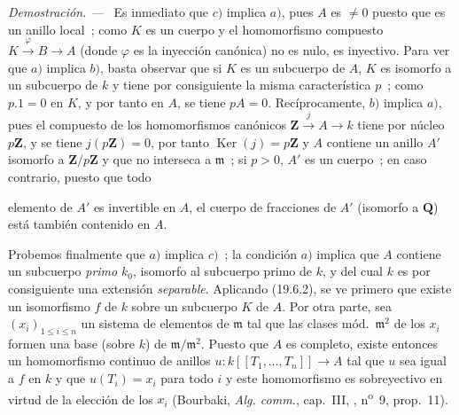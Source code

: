 \documentclass[10pt,oneside]{book}
\newcommand{\oldpage}[2][]{%
  \setcounter{footnote}{0}%
  \marginpar{\scriptsize\textbf{#1}~|~#2}\ignorespaces}
\newenvironment{proof}{%
  \par\medskip\noindent\textit{Demostración. ---\ }}{\par}
\begin{document}
\begin{proof}
Es inmediato que $c)$ implica $a)$, pues $A$ es $\neq0$ puesto que es un
anillo local~; como $K$ es un cuerpo y el homomorfismo compuesto
$K\xrightarrow{\varphi}B\to A$ (donde $\varphi$ es la inyección canónica) no es
nulo, es inyectivo. Para ver que $a)$ implica $b)$, basta
observar que si $K$ es un subcuerpo de $A$, $K$ es isomorfo a un
subcuerpo de $k$ y tiene por consiguiente la misma característica $p$~; como $p.1=0$ en
$K$, y por tanto en $A$, se tiene $pA=0$. Recíprocamente, $b)$ implica $a)$, pues el
compuesto de los homomorfismos canónicos
$\mathbf Z\xrightarrow{j}A\to k$ tiene por núcleo $p\mathbf Z$, y se tiene
$j(p\mathbf Z)=0$, por tanto $\operatorname{Ker}(j)=p\mathbf Z$ y $A$ contiene un
anillo $A'$ isomorfo a $\mathbf Z/p\mathbf Z$ y que no interseca a
$\mathfrak m$~; si $p>0$, $A'$ es un cuerpo~; en caso contrario, puesto que todo

\oldpage[0\textsubscript{IV-1}]{102}

elemento de $A'$ es invertible en $A$, el cuerpo de fracciones de $A'$
(isomorfo a $\mathbf Q$) está también contenido en $A$.

Probemos finalmente que $a)$ implica $c)$~; la condición $a)$ implica que $A$
contiene un subcuerpo \emph{primo} $k_0$, isomorfo al subcuerpo primo de $k$,
y del cual $k$ es por consiguiente una extensión \emph{separable}. Aplicando (19.6.2), se ve
primero que existe un isomorfismo $f$ de $k$ sobre un subcuerpo $K$ de $A$.
Por otra parte, sea $(x_i)_{1\leq i\leq n}$ un sistema de elementos de
$\mathfrak m$ tal que las clases mód.~$\mathfrak m^2$ de los $x_i$ formen una
base (sobre $k$) de $\mathfrak m/\mathfrak m^2$. Puesto que $A$ es completo, existe
entonces un homomorfismo continuo de anillos
$u:k[[T_1,\ldots,T_n]]\to A$ tal que $u$ sea igual a $f$ en $k$ y que
$u(T_i)=x_i$ para todo $i$ y este homomorfismo es sobreyectivo en virtud de la
elección de los $x_i$ (Bourbaki, \emph{Alg. comm.}, cap.~III, ,
n\textsuperscript{o}~9, prop.~11).
\end{proof}
\end{document}
